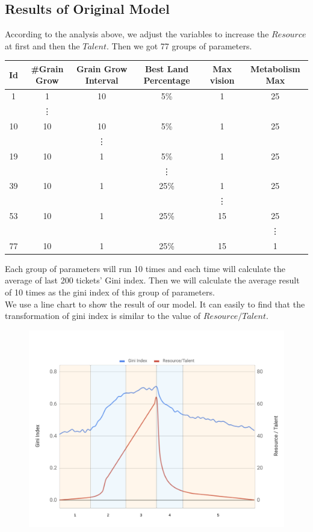 \subsection{Results of Original Model}
According to the analysis above, we adjust the variables to increase the $Resource$ at first and then the $Talent$. Then we got 77 groups of parameters.
\begin{table}[H]
	\begin{tabular}{|c|c|c|c|c|c|}
		\hline
		Id&\#Grain Grow&Grain Grow Interval&Best Land Percentage&Max vision&Metabolism Max\\\hline
		1&1&10&5\%&1&25\\\hline
		&\vdots&&&&\\\hline
		10&10&10&5\%&1&25\\\hline
		&&\vdots&&&\\\hline
		19&10&1&5\%&1&25\\\hline
		&&&\vdots&&\\\hline
		39&10&1&25\%&1&25\\\hline
		&&&&\vdots&\\\hline
		53&10&1&25\%&15&25\\\hline
		&&&&&\vdots\\\hline
		77&10&1&25\%&15&1\\\hline
	\end{tabular}
\end{table}
Each group of parameters will run 10 times and each time will calculate the average of last 200 tickets' Gini index. Then we will calculate the average result of 10 times as the gini index of this group of parameters.\\

We use a line chart to show the result of our model. It can easily to find that the transformation of gini index is similar to the value of $Resource/Talent$.
\begin{figure}
	\begin{center}
		\includegraphics[scale=0.4]{Wealthy_Modell_ex_1.png}
	\end{center}
\end{figure}

